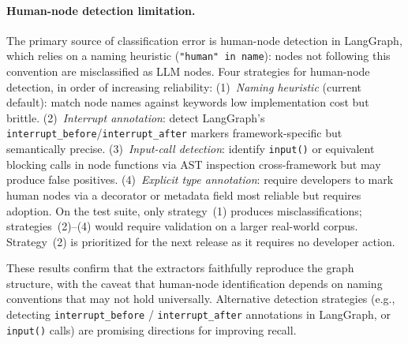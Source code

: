 \paragraph{Human-node detection limitation.}
The primary source of classification error is human-node detection in
LangGraph, which relies on a naming heuristic
(\texttt{"human" in name}): nodes not following this convention are
misclassified as LLM nodes. Four strategies for human-node
detection, in order of increasing reliability:
(1)~\emph{Naming heuristic} (current default): match node names against
keywords low implementation cost but brittle.
(2)~\emph{Interrupt annotation}: detect LangGraph's
\texttt{interrupt\_before}/\texttt{interrupt\_after}
markers framework-specific but semantically precise.
(3)~\emph{Input-call detection}: identify \texttt{input()} or
equivalent blocking calls in node functions via AST
inspection cross-framework but may produce false positives.
(4)~\emph{Explicit type annotation}: require developers to mark human
nodes via a decorator or metadata field most reliable but requires
adoption.
On the test suite, only strategy~(1) produces misclassifications;
strategies~(2)--(4) would require validation on a larger real-world
corpus. Strategy~(2) is prioritized for the next release as it requires
no developer action.

These results confirm that the extractors faithfully reproduce the
graph structure, with the caveat that human-node identification depends
on naming conventions that may not hold universally. Alternative
detection strategies (e.g., detecting \texttt{interrupt\_before} /
\texttt{interrupt\_after} annotations in LangGraph, or \texttt{input()}
calls) are promising directions for improving recall.
